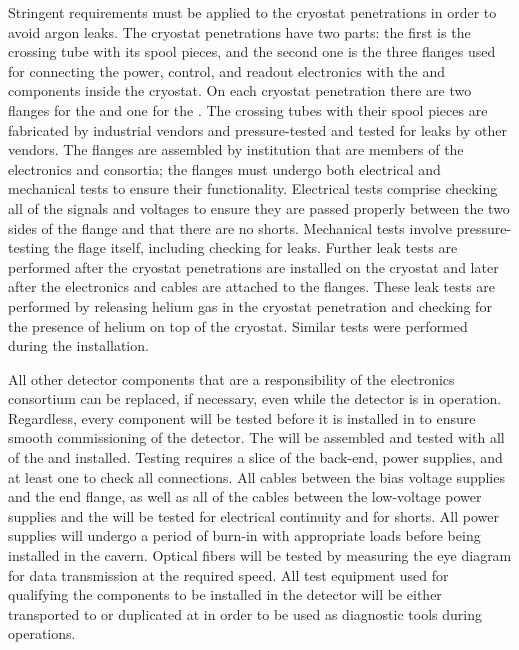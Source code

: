 Stringent requirements must be applied to the cryostat
penetrations in order to avoid argon leaks. The cryostat penetrations 
have two parts: the first is the crossing tube with its spool pieces,
and the second one is the three flanges used for
connecting the power, control, and readout electronics with the
 and  components inside the
cryostat. On each cryostat penetration there are two flanges for
the  and one for the . The crossing
tubes with their spool pieces are fabricated by industrial vendors and pressure-tested
and tested for leaks by other vendors. The flanges are assembled
by institution that are members of the  electronics and  consortia; the
flanges must undergo both electrical and mechanical tests to ensure their
functionality. Electrical tests comprise checking all of the
signals and voltages to ensure they are passed properly between the two sides of the
flange and that there are no shorts. Mechanical tests involve 
pressure-testing the flage itself, including checking for leaks. Further
leak tests are performed after the cryostat penetrations are installed
on the cryostat and later after the  electronics and 
cables are attached to the flanges. These leak tests are
performed by releasing helium gas in the cryostat penetration and
checking for the presence of helium on top of the cryostat. Similar
tests were performed during the  installation.

All other detector components that are a responsibility of
the  electronics consortium can be replaced, if necessary,
even while the detector is in operation. Regardless, every component
will be tested before it is installed in  to ensure
smooth commissioning of the detector. The  will be
assembled and tested with all of the  and 
installed. Testing requires a slice of the  back-end,
power supplies, and at least one  to check all 
connections. All cables between the bias voltage supplies and
the end flange, as well as all of the cables between the low-voltage power
supplies and the  will be tested for electrical
continuity and for shorts. All power supplies will undergo a
period of burn-in with appropriate loads before being installed
in the cavern. Optical fibers will be tested by measuring the
eye diagram for data transmission at the required speed. All
test equipment used for qualifying the components to be installed
in the detector will be either transported to  or duplicated
at  in order to be used as diagnostic tools during operations.

